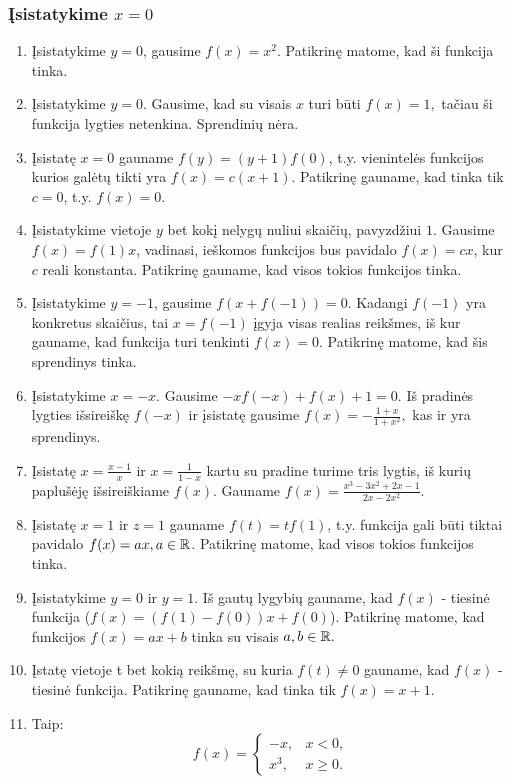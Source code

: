 \subsubsection*{Įsistatykime $x=0$}
\begin{enumerate}
\item
    Įsistatykime $y=0$, gausime $f(x)=x^2$. Patikrinę matome, kad ši
    funkcija tinka.
\item
    Įsistatykime $y=0.$ Gausime, kad su visais $x$ turi būti $f(x)=1,$
    tačiau ši funkcija lygties netenkina. Sprendinių nėra.
\item
    Įsistatę $x=0$ gauname $f(y) = (y+1)f(0)$, t.y. vienintelės funkcijos
    kurios galėtų tikti yra $f(x)=c(x+1)$. Patikrinę gauname, kad tinka tik
    $c=0$, t.y. $f(x)=0$.
\item
    Įsistatykime vietoje $y$ bet kokį nelygų nuliui skaičių, pavyzdžiui
    $1$. Gausime $f(x)=f(1)x$, vadinasi, ieškomos funkcijos bus pavidalo
    $f(x)=cx$, kur $c$ reali konstanta. Patikrinę gauname, kad visos
    tokios funkcijos tinka.
\item
    Įsistatykime $y=-1$, gausime $f(x+f(-1))=0$. Kadangi $f(-1)$ yra
    konkretus skaičius, tai $x=f(-1)$ įgyja visas realias reikšmes, iš kur
    gauname, kad funkcija turi tenkinti $f(x)=0$. Patikrinę matome, kad
    šis sprendinys tinka.
\item
    Įsistatykime $x=-x.$ Gausime $-xf(-x) + f(x) + 1 = 0.$ Iš pradinės
    lygties išsireiškę $f(-x)$ ir įsistatę gausime
    $f(x)=-\frac{1+x}{1+x^2},$ kas ir yra sprendinys.
\item
    Įsistatę $x=\frac{x-1}{x}$ ir $x=\frac{1}{1-x}$ kartu su pradine turime
    tris lygtis, iš kurių paplušėję išsireiškiame $f(x)$. Gauname
    $f(x)=\frac{x^3-3x^2+2x-1}{2x-2x^2}$.
\item
    Įsistatę $x=1$ ir $z=1$ gauname $f(t) = tf(1)$, t.y. funkcija gali
    būti tiktai pavidalo $f(x)=ax, a\in \mathbb R$. Patikrinę matome, kad visos
    tokios funkcijos tinka.
\item
    Įsistatykime $y=0$ ir $y=1$. Iš gautų lygybių gauname, kad $f(x)$ -
    tiesinė funkcija ($f(x) = (f(1)-f(0))x +f(0)$). Patikrinę matome, kad
    funkcijos $f(x)=ax+b$ tinka su visais $a,b\in \mathbb R.$
\item
    Įstatę vietoje t bet kokią reikšmę, su kuria $f(t)\neq 0$ gauname, kad
    $f(x)$ - tiesinė funkcija. Patikrinę gauname, kad tinka tik $f(x) = x
    + 1$.
\item
    Taip: $$f(x) = \begin{cases}-x,& x<0, \\ x^3,& x\geq 0.\end{cases}$$

\end{enumerate}
